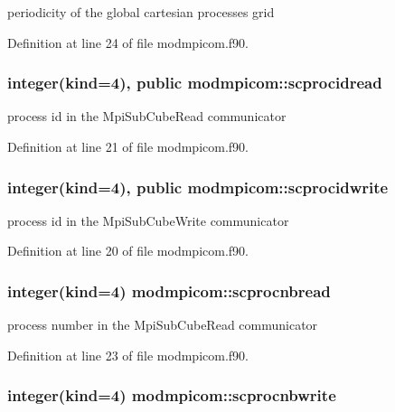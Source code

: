 periodicity of the global cartesian processes grid 



Definition at line 24 of file modmpicom.\-f90.

\hypertarget{classmodmpicom_af5dc4e2e2c054269623303e30bb81ee4}{
\subsubsection[{scprocidread}]{\setlength{\rightskip}{0pt plus 5cm}integer(kind=4), public modmpicom\-::scprocidread}}\label{classmodmpicom_af5dc4e2e2c054269623303e30bb81ee4}


process id in the Mpi\-Sub\-Cube\-Read communicator 



Definition at line 21 of file modmpicom.\-f90.

\hypertarget{classmodmpicom_abebf60043baa916259ad148a0856c87a}{
\subsubsection[{scprocidwrite}]{\setlength{\rightskip}{0pt plus 5cm}integer(kind=4), public modmpicom\-::scprocidwrite}}\label{classmodmpicom_abebf60043baa916259ad148a0856c87a}


process id in the Mpi\-Sub\-Cube\-Write communicator 



Definition at line 20 of file modmpicom.\-f90.

\hypertarget{classmodmpicom_a8fde31beaf4b43228d7f93325630cefa}{
\subsubsection[{scprocnbread}]{\setlength{\rightskip}{0pt plus 5cm}integer(kind=4) modmpicom\-::scprocnbread}}\label{classmodmpicom_a8fde31beaf4b43228d7f93325630cefa}


process number in the Mpi\-Sub\-Cube\-Read communicator 



Definition at line 23 of file modmpicom.\-f90.

\hypertarget{classmodmpicom_a8281c8567826b44d76d7a801203c99a8}{
\subsubsection[{scprocnbwrite}]{\setlength{\rightskip}{0pt plus 5cm}integer(kind=4) modmpicom\-::scprocnbwrite}}\label{classmodmpicom_a8281c8567826b44d76d7a801203c99a8}


